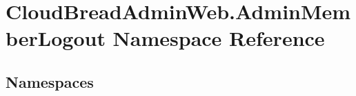 \hypertarget{a00418}{}\section{Cloud\+Bread\+Admin\+Web.\+Admin\+Member\+Logout Namespace Reference}
\label{a00418}
\subsection*{Namespaces}
\begin{DoxyCompactItemize}
\end{DoxyCompactItemize}
